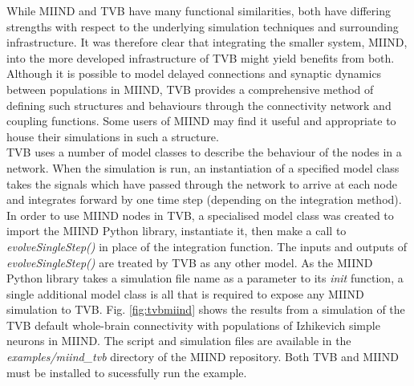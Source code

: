 \documentclass[utf8]{frontiersSCNS} %
\begin{document}
While MIIND and TVB have many functional similarities, both have differing strengths with respect to the underlying simulation techniques and surrounding infrastructure. It was therefore clear that integrating the smaller system, MIIND, into the more developed infrastructure of TVB might yield benefits from both.\\

Although it is possible to model delayed connections and synaptic dynamics between populations in MIIND, TVB provides a comprehensive method of defining such structures and behaviours through the connectivity network and coupling functions. Some users of MIIND may find it useful and appropriate to house their simulations in such a structure.\\

TVB uses a number of model classes to describe the behaviour of the nodes in a network. When the simulation is run, an instantiation of a specified model class takes the signals which have passed through the network to arrive at each node and integrates forward by one time step (depending on the integration method). In order to use MIIND nodes in TVB, a specialised model class was created to import the MIIND Python library, instantiate it, then make a call to \textit{evolveSingleStep()} in place of the integration function. The inputs and outputs of \textit{evolveSingleStep()} are treated by TVB as any other model. As the MIIND Python library takes a simulation file name as a parameter to its \textit{init} function, a single additional model class is all that is required to expose any MIIND simulation to TVB. Fig. \ref{fig:tvbmiind} shows the results from a simulation of the TVB default whole-brain connectivity with populations of Izhikevich simple neurons in MIIND. The script and simulation files are available in the \textit{examples/miind\_tvb} directory of the MIIND repository. Both TVB and MIIND must be installed to sucessfully run the example. \\
\end{document}
